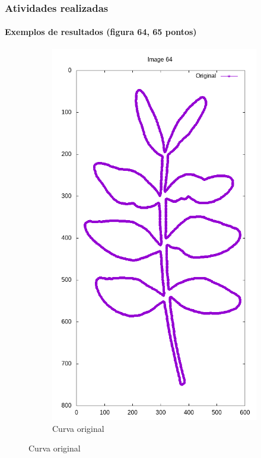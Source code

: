 \begin{frame}
	\frametitle{Atividades realizadas}
	\framesubtitle{Exemplos de resultados (figura 64, 65 pontos)}
	
	\begin{figure}[ht!]
		\centering
		\begin{subfigure}[t]{0.24\textwidth}
			\centering
			\includegraphics[width=\textwidth]{img/rec/64ori.png}
			\caption{Curva original}
		\end{subfigure}

\end{figure}
\end{frame}

